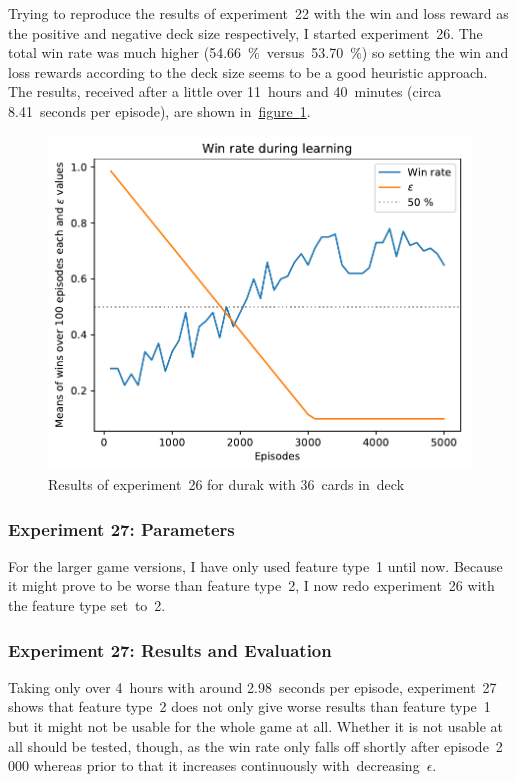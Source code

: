 \documentclass[a4paper,titlepage]{article}
\begin{document}
Trying to reproduce the results of experiment~22 with the win and loss reward as the positive and negative deck size respectively, I started experiment~26. The total win rate was much higher (54.66~\%~versus~53.70~\%) so setting the win and loss rewards according to the deck size seems to be a good heuristic approach. The results, received after a little over 11~hours and 40~minutes (circa 8.41~seconds per episode), are shown in~\hyperref[fig:exp26]{figure~\ref*{fig:exp26}}.
\begin{figure}
  \centering
  \includegraphics[width=\textwidth]{../experiments/exp26/win_stats.pdf}
  \caption{Results of experiment~26 for durak with 36~cards in~deck}
  \label{fig:exp26}
\end{figure}

\subsubsection*{Experiment 27: Parameters}

For the larger game versions, I have only used feature type~1 until now. Because it might prove to be worse than feature type~2, I now redo experiment~26 with the feature type set~to~2.

\subsubsection*{Experiment 27: Results and Evaluation}

Taking only over 4~hours with around 2.98~seconds per episode, experiment~27 shows that feature type~2 does not only give worse results than feature type~1 but it might not be usable for the whole game at all. Whether it is not usable at all should be tested, though, as the win rate only falls off shortly after episode~2\,000 whereas prior to that it increases continuously with~decreasing~$\epsilon$.
\end{document}
